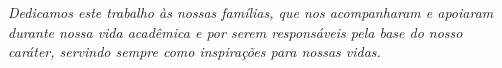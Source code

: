 \begin{dedicatoria}
   \vspace*{\fill}
   \centering
   \noindent
 \textit{
    	Dedicamos este trabalho às nossas famílias, que nos acompanharam e apoiaram durante nossa vida acadêmica
        e por serem responsáveis pela base do nosso caráter, servindo sempre como inspirações para nossas vidas. }
\end{dedicatoria}
